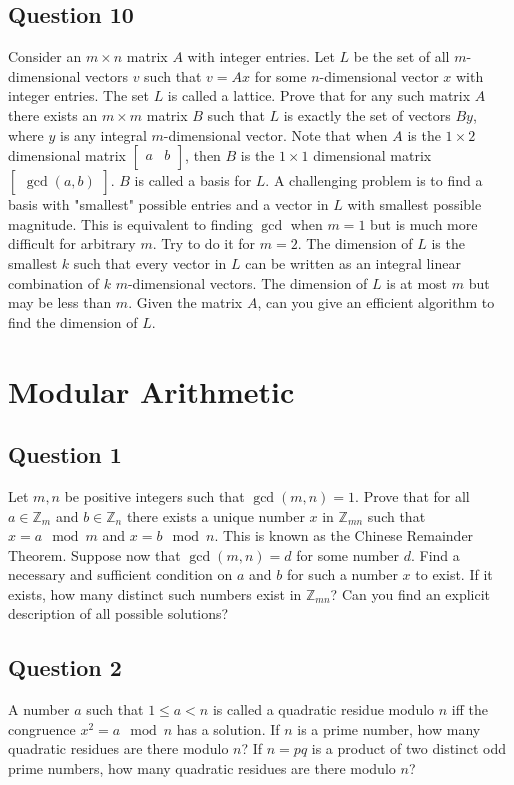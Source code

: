 \documentclass[12pt]{report}
\begin{document}
\section*{Question 10}
Consider an $m \times n$ matrix $A$ with integer entries. Let $L$ be the set of all $m$-dimensional vectors $v$ such that $v = Ax$ for some $n$-dimensional vector $x$ with integer entries. The set $L$ is called a lattice. Prove that for any such matrix $A$ there exists an $m \times m$ matrix $B$ such that $L$ is exactly the set of vectors $By$, where $y$ is any integral $m$-dimensional vector. Note that when $A$ is the $1 \times 2$ dimensional matrix $\begin{bmatrix}
  a & b\\
\end{bmatrix}$, then $B$ is the $1 \times 1$ dimensional matrix $\begin{bmatrix}
  \gcd(a, b)
\end{bmatrix}$. $B$ is called a basis for $L$. A challenging problem is to find a basis with "smallest" possible entries and a vector in $L$ with smallest possible magnitude. This is equivalent to finding $\gcd$ when $m = 1$ but is much more difficult for arbitrary $m$. Try to do it for $m = 2$. The dimension of $L$ is the smallest $k$ such that every vector in $L$ can be written as an integral linear combination of $k$ $m$-dimensional vectors. The dimension of $L$ is at most $m$ but may be less than $m$. Given the matrix $A$, can you give an efficient algorithm to find the dimension of $L$.
\chapter{Modular Arithmetic}
\section*{Question 1}
Let $m, n$ be positive integers such that $\gcd(m, n) = 1$. Prove that for all $a \in \mathbb{Z}_{m}$ and $b \in \mathbb{Z}_{n}$ there exists a unique number $x$ in $\mathbb{Z}_{mn}$ such that $x = a \mod m$ and $x = b \mod n$. This is known as the Chinese Remainder Theorem. Suppose now that $\gcd(m, n) = d$ for some number $d$. Find a necessary and sufficient condition on $a$ and $b$ for such a number $x$ to exist. If it exists, how many distinct such numbers exist in $\mathbb{Z}_{mn}$? Can you find an explicit description of all possible solutions? 
\section*{Question 2}
A number $a$ such that $1 \leq a < n$ is called a quadratic residue modulo $n$ iff the congruence $x^2 = a \mod n$ has a solution. If $n$ is a prime number, how many quadratic residues are there modulo $n$? If $n = pq$ is a product of two distinct odd prime numbers, how many quadratic residues are there modulo $n$?
\end{document}
